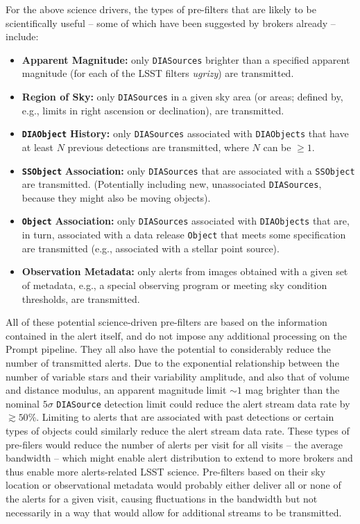 \documentclass[DM,lsstdraft,authoryear,toc]{lsstdoc}
\begin{document}
For the above science drivers, the types of pre-filters that are likely to be scientifically useful -- some of which have been suggested by brokers already -- include:
\begin{itemize}
\item {\bf Apparent Magnitude:} only {\tt DIASources} brighter than a specified apparent magnitude (for each of the LSST filters {\it ugrizy}) are transmitted. 
\item {\bf Region of Sky:} only {\tt DIASources} in a given sky area (or areas; defined by, e.g., limits in right ascension or declination), are transmitted. 
\item \texttt{\bf DIAObject} {\bf History:} only {\tt DIASources} associated with {\tt DIAObjects} that have at least $N$ previous detections are transmitted, where $N$ can be $\geq1$. 
\item \texttt{\bf SSObject} {\bf Association:} only {\tt DIASources} that are associated with a {\tt SSObject} are transmitted. (Potentially including new, unassociated {\tt DIASources}, because they might also be moving objects).
\item \texttt{\bf Object} {\bf Association:} only {\tt DIASources} associated with {\tt DIAObjects} that are, in turn, associated with a data release {\tt Object} that meets some specification are transmitted (e.g., associated with a stellar point source).
\item {\bf Observation Metadata:} only alerts from images obtained with a given set of metadata, e.g., a special observing program or meeting sky condition thresholds, are transmitted.
\end{itemize}

All of these potential science-driven pre-filters are based on the information contained in the alert itself, and do not impose any additional processing on the Prompt pipeline.
They all also have the potential to considerably reduce the number of transmitted alerts.
Due to the exponential relationship between the number of variable stars and their variability amplitude, and also that of volume and distance modulus, an apparent magnitude limit $\sim1$ mag brighter than the nominal $5{\sigma}$ {\tt DIASource} detection limit could reduce the alert stream data rate by $\gtrsim50$\%.
Limiting to alerts that are associated with past detections or certain types of objects could similarly reduce the alert stream data rate.
These types of pre-filers would reduce the number of alerts per visit for all visits -- the average bandwidth -- which might enable alert distribution to extend to more brokers and thus enable more alerts-related LSST science.
Pre-filters based on their sky location or observational metadata would probably either deliver all or none of the alerts for a given visit, causing fluctuations in the bandwidth but not necessarily in a way that would allow for additional streams to be transmitted.
\end{document}
